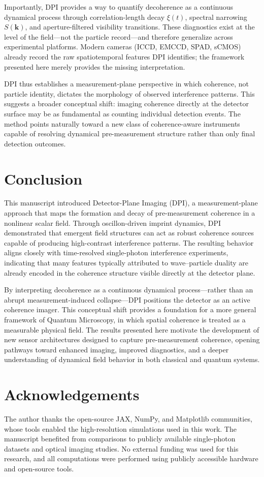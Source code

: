 Importantly, DPI provides a way to quantify decoherence as a continuous dynamical process through correlation-length decay $\xi(t)$, spectral narrowing $S(\mathbf{k})$, and aperture-filtered visibility transitions. These diagnostics exist at the level of the field---not the particle record---and therefore generalize across experimental platforms. Modern cameras (ICCD, EMCCD, SPAD, sCMOS) already record the raw spatiotemporal features DPI identifies; the framework presented here merely provides the missing interpretation.

DPI thus establishes a measurement-plane perspective in which coherence, not particle identity, dictates the morphology of observed interference patterns. This suggests a broader conceptual shift: imaging coherence directly at the detector surface may be as fundamental as counting individual detection events. The method points naturally toward a new class of coherence-aware instruments capable of resolving dynamical pre-measurement structure rather than only final detection outcomes.

\section{Conclusion}
This manuscript introduced Detector-Plane Imaging (DPI), a measurement-plane approach that maps the formation and decay of pre-measurement coherence in a nonlinear scalar field. Through oscillon-driven imprint dynamics, DPI demonstrated that emergent field structures can act as robust coherence sources capable of producing high-contrast interference patterns. The resulting behavior aligns closely with time-resolved single-photon interference experiments, indicating that many features typically attributed to wave--particle duality are already encoded in the coherence structure visible directly at the detector plane.

By interpreting decoherence as a continuous dynamical process---rather than an abrupt measurement-induced collapse---DPI positions the detector as an active coherence imager. This conceptual shift provides a foundation for a more general framework of Quantum Microscopy, in which spatial coherence is treated as a measurable physical field. The results presented here motivate the development of new sensor architectures designed to capture pre-measurement coherence, opening pathways toward enhanced imaging, improved diagnostics, and a deeper understanding of dynamical field behavior in both classical and quantum systems.

\section*{Acknowledgements}
The author thanks the open-source JAX, NumPy, and Matplotlib communities, whose tools enabled the high-resolution simulations used in this work. The manuscript benefited from comparisons to publicly available single-photon datasets and optical imaging studies. No external funding was used for this research, and all computations were performed using publicly accessible hardware and open-source tools.





